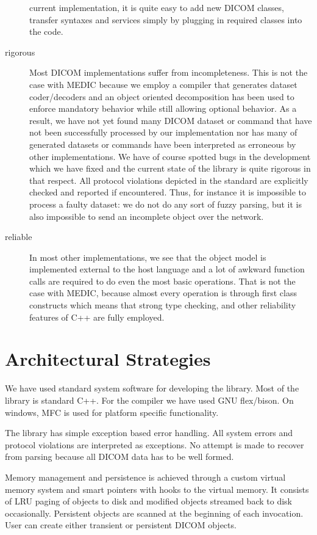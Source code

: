\documentclass[a4paper,10pt]{article}
\begin{document}
\begin{description}
current implementation, it is quite easy to add new DICOM classes,
transfer syntaxes and services simply by plugging in required classes
into the code.
\item[rigorous] Most DICOM implementations suffer from incompleteness.
 This is not the case with MEDIC because we employ a compiler that
 generates dataset coder/decoders and an object oriented decomposition
 has been used to enforce mandatory behavior while still allowing
 optional behavior. As a result, we have not yet found many DICOM
 dataset or command that have not been successfully processed by
 our implementation nor has many of generated datasets or commands
 have been interpreted as erroneous by other implementations. We have
 of course spotted bugs in the development which we have fixed and the
current state of the library is quite rigorous in that respect. All
protocol violations depicted in the standard are explicitly checked
and reported if encountered. Thus, for instance it is impossible to
process a faulty dataset: we do not do any sort of fuzzy parsing, but
it is also impossible to send an incomplete object over the network.
\item[reliable] In most other implementations, we see that the
object model is implemented external to the host language and a lot
of awkward function calls are required to do even the most basic
operations. That is not the case with MEDIC, because almost every
operation is through first class constructs which means that strong
type checking, and other reliability features of C++ are fully employed.
\end{description}

\section{Architectural Strategies}

We have used standard system software for developing the library. Most
of the library is standard C++. For the compiler we have used GNU
flex/bison. On windows, MFC is used for platform specific
functionality.

The library has simple exception based error handling. All system
errors and protocol violations are interpreted as exceptions. No
attempt is made to recover from parsing because all DICOM data has to
be well formed.

Memory management and persistence is achieved through a custom virtual
memory system and smart pointers with hooks to the virtual memory. It
consists of LRU paging of objects to disk and modified objects
streamed back to disk occasionally. Persistent objects are scanned at
the beginning of each invocation. User can create either transient or
persistent DICOM objects.
\end{document}
